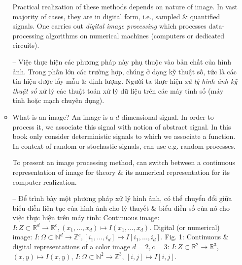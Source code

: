 \documentclass{article}
\begin{document}
\begin{itemize}
\begin{itemize}
        Practical realization of these methods depends on nature of image. In vast majority of cases, they are in digital form, i.e., sampled \& quantified signals. One carries out {\it digital image processing} which processes data-processing algorithms on numerical machines (computers or dedicated circuits).
        
        -- Việc thực hiện các phương pháp này phụ thuộc vào bản chất của hình ảnh. Trong phần lớn các trường hợp, chúng ở dạng kỹ thuật số, tức là các tín hiệu được lấy mẫu \& định lượng. Người ta thực hiện {\it xử lý hình ảnh kỹ thuật số} xử lý các thuật toán xử lý dữ liệu trên các máy tính số (máy tính hoặc mạch chuyên dụng).
        \item {\sf What is an image?} An image is a $d$ dimensional signal. In order to process it, we associate this signal with notion of abstract signal. In this book only consider deterministic signals to which we associate a function. In context of random or stochastic signals, can use e.g. random processes.
        
        To present an image processing method, can switch between a continuous representation of image for theory \& its numerical representation for its computer realization.
        
        -- Để trình bày một phương pháp xử lý hình ảnh, có thể chuyển đổi giữa biểu diễn liên tục của hình ảnh cho lý thuyết \& biểu diễn số của nó cho việc thực hiện trên máy tính: Continuous image: $I:Z\subset\mathbb{R}^d\to\mathbb{R}^c,(x_1,\ldots,x_d)\mapsto I(x_1,\ldots,x_d)$. Digital (or numerical) image: $I:\Omega\subset\mathbb{N}^d\to\mathbb{Z}^c,[i_1,\ldots,i_d]\mapsto I[i_1,\ldots,i_d]$. {\sf Fig. 1: Continuous \& digital representations of a color image $d = 2,c = 3$: $I:Z\subset\mathbb{R}^2\to\mathbb{R}^3$, $(x,y)\mapsto I(x,y)$, $I:\Omega\subset\mathbb{N}^2\to\mathbb{Z}^3$, $[i,j]\mapsto I[i,j]$.}
        

\end{itemize}
\end{itemize}
\end{document}
